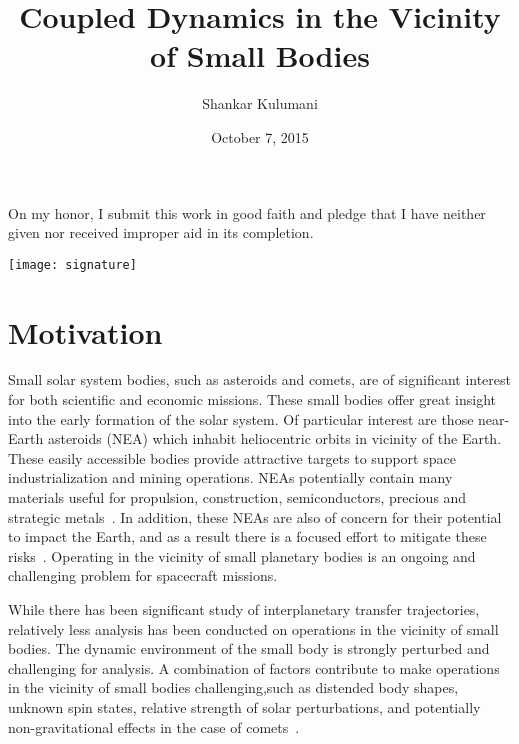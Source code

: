 \documentclass[11pt]{article} %
\title{Coupled Dynamics in the Vicinity of Small Bodies}
\author{Shankar Kulumani}
\date{October 7, 2015}
\begin{document}
\makeatletter
\begin{titlepage}
	\centering
	\LARGE{\@title \par} 
	\vspace{1cm}
	\Large{\@date \par}
	\vfill
	\Large{On my honor, I submit this work in good faith and pledge that I have neither given nor received improper aid in its completion. \par}
	\vspace{1cm}
	\Large{\@author \par}
	\vspace{1cm}
	\texttt{[image: signature]}\\
	\vspace{-0.5cm}
	\makebox[2.5in]{\hrulefill}
\end{titlepage}
\makeatother
\section{Motivation}

Small solar system bodies, such as asteroids and comets, are of significant interest for both scientific and economic missions.
These small bodies offer great insight into the early formation of the solar system.
Of particular interest are those near-Earth asteroids (NEA) which inhabit heliocentric orbits in vicinity of the Earth.
These easily accessible bodies provide attractive targets to support space industrialization and mining operations.
NEAs potentially contain many materials useful for propulsion, construction, semiconductors, precious and strategic metals~\cite{ross2001}.
In addition, these NEAs are also of concern for their potential to impact the Earth, and as a result there is a focused effort to mitigate these risks~\cite{wie2008}.
Operating in the vicinity of small planetary bodies is an ongoing and challenging problem for spacecraft missions.

While there has been significant study of interplanetary transfer trajectories, relatively less analysis has been conducted on operations in the vicinity of small bodies.
The dynamic environment of the small body is strongly perturbed and challenging for analysis.
A combination of factors contribute to make operations in the vicinity of small bodies challenging,such as distended body shapes, unknown spin states, relative strength of solar perturbations, and potentially non-gravitational effects in the case of comets~\cite{scheeres2012}.
\end{document}
